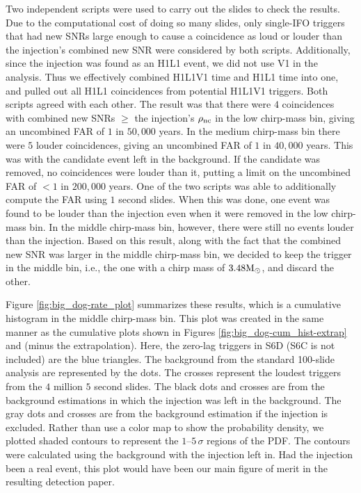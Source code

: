 Two independent scripts were used to carry out the slides to check the results.
Due to the computational cost of doing so many slides, only single-\ac{IFO}
triggers that had new \acp{SNR} large enough to cause a coincidence as loud or
louder than the injection's combined new \ac{SNR} were considered by both
scripts. Additionally, since the injection was found as an H1L1 event, we did
not use V1 in the analysis. Thus we effectively combined H1L1V1 time and H1L1
time into one, and pulled out all H1L1 coincidences from potential H1L1V1
triggers. Both scripts agreed with each other. The result was that there were
$4$ coincidences with combined new \acp{SNR} $\geq$ the injection's $\rho_{\mathrm{nc}}$
in the low chirp-mass bin, giving an uncombined \ac{FAR} of $1$ in $50,000$
years. In the medium chirp-mass bin there were $5$ louder coincidences, giving
an uncombined \ac{FAR} of $1$ in $40,000$ years. This was with the candidate
event left in the background. If the candidate was removed, no coincidences
were louder than it, putting a limit on the uncombined \ac{FAR} of $< 1$ in
$200,000$ years. One of the two scripts was able to additionally compute the
\ac{FAR} using $1$ second slides. When this was done, one event was found to be
louder than the injection even when it were removed in the low chirp-mass bin.
In the middle chirp-mass bin, however, there were still no events louder than
the injection. Based on this result, along with the fact that the combined new
\ac{SNR} was larger in the middle chirp-mass bin, we decided to keep the
trigger in the middle bin, i.e., the one with a chirp mass of $3.48\mathrm{M_\odot}$, and
discard the other.

Figure \ref{fig:big_dog-rate_plot} summarizes these results, which is a
cumulative histogram in the middle chirp-mass bin. This plot was created in the
same manner as the cumulative plots shown in Figures
\ref{fig:big_dog-cum_hist-extrap} and (minus the extrapolation). Here, the
zero-lag triggers in S6D (S6C is not included) are the blue triangles. The
background from the standard 100-slide analysis are represented by the dots.
The crosses represent the loudest triggers from the $4$ million $5$ second
slides. The black dots and crosses are from the background estimations in which
the injection was left in the background. The gray dots and crosses are from
the background estimation if the injection is excluded. Rather than use a color
map to show the probability density, we plotted shaded contours to represent
the $1$--$5\,\sigma$ regions of the \ac{PDF}. The contours were calculated
using the background with the injection left in. Had the injection been a real
event, this plot would have been our main figure of merit in the resulting
detection paper.

